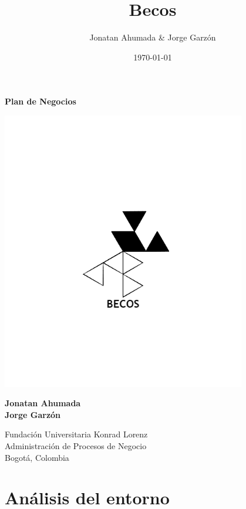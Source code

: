 \documentclass[11pt]{article}
\author{Jonatan Ahumada \& Jorge Garzón}
\date{\today}
\title{Becos}
\begin{document}
\begin{titlepage}
   \begin{center}
       \vspace*{1cm}

       \textbf{Plan de Negocios}

       
        
        \includegraphics[width=0.8\textwidth]{assets/build/logotipo_nuevo}          
       \vspace{1.5cm}

       \textbf{Jonatan Ahumada \\
              Jorge Garzón}

       \vfill
           
               
       \vspace{0.8cm}
     

            
       Fundación Universitaria Konrad Lorenz\\
       Administración de Procesos de Negocio\\
       Bogotá, Colombia\\
 
            
   \end{center}
\end{titlepage}
\tableofcontents
\section{Análisis del entorno}
\label{sec:org445c03c}
\end{document}
